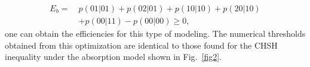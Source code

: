 \documentclass[aps,pra,reprint, superscriptaddress,showkeys]{revtex4-2}
\theoremstyle{plain}
\begin{document}

 

\begin{equation}
\begin{aligned}
E_b =\ & p(01 | 01) + p(02 | 01) + p(10 | 10) + p(20 | 10) \\
       & + p(00 | 11) - p(00 | 00) \geq 0,
\end{aligned}
\end{equation}
 one can  obtain the efficiencies for this type of modeling. The numerical thresholds obtained from this optimization are identical to those found for the CHSH inequality under the absorption model shown in Fig.~\ref{fig2}. 



\end{document}
